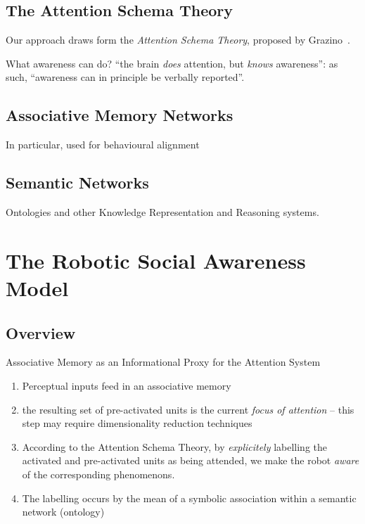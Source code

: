 \documentclass[a4paper]{article}
\begin{document}
\subsection{The Attention Schema Theory}

Our approach draws form the \emph{Attention Schema Theory}, proposed by
Grazino~\cite{graziano2013consciousness}.

What awareness can do? ``the brain \emph{does} attention, but \emph{knows}
awareness'': as such, ``awareness can in principle be verbally reported''.



\subsection{Associative Memory Networks}


In particular, used for behavioural alignment

\subsection{Semantic Networks}

Ontologies and other Knowledge Representation and Reasoning systems.


\section{The Robotic Social Awareness Model}

\subsection{Overview}

Associative Memory as an Informational Proxy for the Attention System


\begin{enumerate}
    \item Perceptual inputs feed in an associative memory

    \item the resulting set of pre-activated units is the current
        \emph{focus of attention} -- this step may require dimensionality
        reduction techniques

    \item According to the Attention Schema Theory, by \emph{explicitely}
        labelling the activated and pre-activated units as being attended, we
        make the robot \emph{aware} of the corresponding phenomenons.

    \item The labelling occurs by the mean of a symbolic association within a
        semantic network (ontology)

\end{enumerate}
\end{document}
